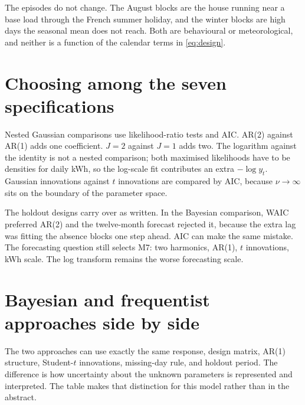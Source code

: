 \documentclass[11pt]{article}
\begin{document}
The episodes do not change. The August blocks are the house running near a
base load through the French summer holiday, and the winter blocks are high
days the seasonal mean does not reach. Both are behavioural or
meteorological, and neither is a function of the calendar terms in
\eqref{eq:design}.

\section{Choosing among the seven specifications}

Nested Gaussian comparisons use likelihood-ratio tests and AIC. AR(2) against
AR(1) adds one coefficient. $J = 2$ against $J = 1$ adds two. The logarithm
against the identity is not a nested comparison; both maximised likelihoods
have to be densities for daily kWh, so the log-scale fit contributes an extra
$-\log y_t$. Gaussian innovations against $t$ innovations are compared by AIC,
because $\nu \to \infty$ sits on the boundary of the parameter space.

The holdout designs carry over as written. In the Bayesian comparison, WAIC
preferred AR(2) and the twelve-month forecast rejected it, because the extra
lag was fitting the absence blocks one step ahead. AIC can make the same
mistake. The forecasting question still selects M7: two harmonics, AR(1), $t$
innovations, kWh scale. The log transform remains the worse forecasting scale.

\section{Bayesian and frequentist approaches side by side}

The two approaches can use exactly the same response, design matrix, AR(1)
structure, Student-$t$ innovations, missing-day rule, and holdout period. The
difference is how uncertainty about the unknown parameters is represented and
interpreted. The table makes that distinction for this model rather than in
the abstract.
\end{document}
